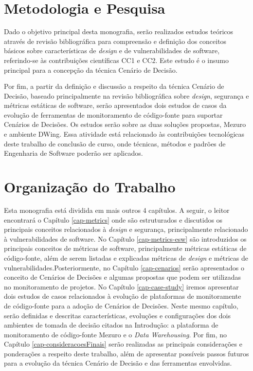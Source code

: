
\section{Metodologia e Pesquisa}

Dado o objetivo principal desta monografia, serão realizados estudos teóricos através de revisão bibliográfica para compreensão e definição dos conceitos básicos sobre características de \emph{design}  e de vulnerabilidades de software, referindo-se às contribuições científicas CC1 e CC2. Este estudo é o insumo principal para a concepção da técnica Cenário de Decisão.

%

Por fim, a  partir da definição e discussão a respeito da técnica Cenário de Decisão, baseado principalmente na revisão bibliográfica sobre \emph{design}, segurança e métricas estáticas de software, serão apresentados dois estudos de casos da evolução de ferramentas de monitoramento de código-fonte para suportar Cenários de Decisões. Os estudos serão sobre as duas soluções propostas, Mezuro e ambiente DWing.
%
Essa atividade está relacionado às contribuições tecnológicas deste trabalho de conclusão de curso, onde técnicas, métodos e padrões de Engenharia de Software poderão ser aplicados.



\section{Organização do Trabalho}

Esta monografia está dividida em mais outros 4 capítulos. A seguir, o leitor encontrará o Capítulo \ref{cap-metrics} onde são estruturados e discutidos os principais conceitos relacionados à \emph{design} e segurança, principalmente relacionado à vulnerabilidades de software. No Capítulo \ref{cap-metrics-esw} são introduzidos os principais conceitos de métricas de software, principalmente métricas estáticas de código-fonte, além de serem listadas e explicadas métricas de \emph{design} e métricas de vulnerabilidades.Posteriormente, no Capítulo \ref{cap-cenarios}  serão apresentados o conceito de Cenários de Decisões e algumas propostas que podem ser utilizadas no monitoramento de projetos. No Capítulo \ref{cap-case-study} iremos apresentar dois estudos de casos relacionados à evolução de plataformas de monitoramente de código-fonte para a adoção de Cenários de Decisões. Neste mesmo capítulo, serão definidas e descritas características, evoluções e configurações dos dois ambientes de tomada de decisão citados na Introdução: a plataforma de monitoramento de código-fonte Mezuro e o \emph{Data Warehousing}. Por fim, no Capítulo \ref{cap-consideracoesFinais} serão realizadas as principais considerações e ponderações a respeito deste trabalho, além de apresentar possíveis passos futuros para a evolução da técnica Cenário de Decisão e das ferramentas envolvidas.

